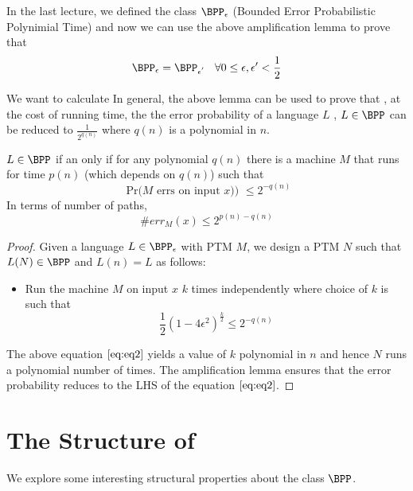 In the last lecture, we defined the class $\BPP_\epsilon$ (Bounded Error Probabilistic Polynimial Time) and now we can use the above amplification lemma to prove that
\[\BPP_{\epsilon} = \BPP_{\epsilon^{'}} \hspace{3mm}\forall  0 \leq \epsilon , \epsilon' < \frac{1}{2} \]

We want to calculate
In general, the above lemma can be used to prove that , at the cost of running time, the the error probability of a language $L$ , 
$L \in \BPP$ can be reduced to $\frac{1}{2^{q(n)}}$ where $q(n)$ is a polynomial in $n$.
 
\begin{lemma}
$L \in \BPP$ if an only if for any polynomial $q(n)$ there is a machine $M$ that runs for time $p(n)$ (which depends on $q(n)$) such that \\
\[ \textrm{ Pr($M$ errs on input $x$)) } \le 2^{-q(n)} \] 
In terms of number of paths,
\[ \#err_M(x) \le  2^{p(n)-q(n)} \]
\end{lemma}
\begin{proof}
Given a language $L \in \BPP_\epsilon$ with PTM $M$, we design a PTM $N$ such that $L(N) \in \BPP$ and $L(n) = L$ as follows:
\begin{itemize}
 \item Run the machine $M$ on input $x$ $k$ times independently where choice of $k$ is such that
\\
\begin{equation}\label{eq:eq2}
 \frac{1}{2} \left(1 - 4\epsilon^2\right)^{\frac{k}{2}} \leq 2^{-q(n)}
\end{equation}

\end{itemize}
The above equation $\eqref{eq:eq2}$ yields a value of $k$ polynomial in $n$ and hence $N$ runs a polynomial number of times.
The amplification lemma ensures that the error probability reduces to the LHS of the equation $\eqref{eq:eq2}$.
\end{proof}

\section*{The Structure of \BPP}
We explore some interesting structural properties about the class $\BPP$.

